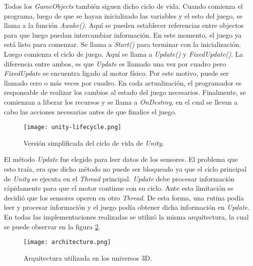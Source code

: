 Todos los \emph{GameObjects} también siguen dicho ciclo de vida. Cuando comienza el programa, luego de que se hayan inicializado las variables y el esto del juego, se llama a la función \emph{Awake()}. Aquí se pueden establecer referencias entre objectos para que luego puedan intercambiar información. En este momento, el juego ya está listo para comenzar. Se llama a \emph{Start()} para terminar con la inicialización. Luego comienza el ciclo de juego. Aquí se llama a \emph{Update()} y \emph{FixedUpdate()}. La diferencia entre ambos, es que \emph{Update} es llamado una vez por cuadro pero \emph{FixedUpdate} se encuentra ligado al motor físico. Por este motivo, puede ser llamado cero o más veces por cuadro. En cada actualización, el programador es responsable de realizar los cambios al estado del juego necesarios. Finalmente, se comienzan a liberar los recursos y se llama a \emph{OnDestroy}, en el cual se llevan a cabo las acciones necesarias antes de que finalice el juego.

 \begin{figure}[H]
	\centering
    \texttt{[image: unity-lifecycle.png]}
    \caption{Versión simplificada del ciclo de vida de \emph{Unity}.}
	\label{fig:unity-lifecycle}
\end{figure}

El método \emph{Update} fue elegido para leer datos de los sensores. El problema que esto traía, era que dicho método no puede ser bloqueado ya que el ciclo principal de \emph{Unity} se ejecuta en el \emph{Thread} principal. \emph{Update} debe procesar información rápidamente para que el motor continue con su ciclo. Ante esta limitación se decidió que los sensores operen en otro \emph{Thread}. De esta forma, una rutina podía leer y procesar información y el juego podía obtener dicha información en \emph{Update}. En todas las implementaciones realizadas se utilizó la misma arquitectura, la cual se puede observar en la figura  \ref{fig:architecture}.

 \begin{figure}[H]
	\centering
    \texttt{[image: architecture.png]}
    \caption{Arquitectura utilizada en los universos 3D.}
	\label{fig:architecture}
\end{figure}

